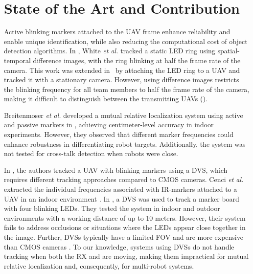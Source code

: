 \documentclass[lettersize,preprint]{elsarticle}
\begin{document}
\section{State of the Art and Contribution}\label{sec:sota}

Active blinking markers attached to the \gls{UAV} frame enhance reliability and enable unique identification, while also reducing the computational cost of object detection algorithms.
In \cite{whiteOpticalSpatialLocalization2019}, White \emph{et al.} tracked a static \gls{LED} ring using spatial-temporal difference images, with the ring blinking at half the frame rate of the camera. 
This work was extended in~\cite{whiteRobustOpticalSpatial2019} by attaching the \gls{LED} ring to a \gls{UAV} and tracked it with a stationary camera.
However, using difference images restricts the blinking frequency for all team members to half the frame rate of the camera, making it difficult to distinguish between the transmitting \glspl{UAV} ().

Breitenmoser \emph{et al.} developed a mutual relative localization system using active and passive markers in \cite{breitenmoserMonocularVisionbasedSystem2011}, achieving centimeter-level accuracy in indoor experiments. 
However, they observed that different marker frequencies could enhance robustness in differentiating robot targets. 
Additionally, the system was not tested for cross-talk detection when robots were close.

In \cite{stuckeyOpticalSpatialLocalization2021, stuckeySpatialLocalizationAttitude2022,censiLowlatencyLocalizationActive2013,ebmerRealtime6DoFPose2024}, the authors tracked a \gls{UAV} with blinking markers using a \gls{DVS}, which requires different tracking approaches compared to \gls{CMOS} cameras.
Cenci \emph{et al.} extracted the individual frequencies associated with \gls{IR}-markers attached to a \gls{UAV} in an indoor environment \cite{censiLowlatencyLocalizationActive2013}.
In \cite{ebmerRealtime6DoFPose2024}, a \gls{DVS} was used to track a marker board with four blinking \glspl{LED}. 
They tested the system in indoor and outdoor environments with a working distance of up to 10 meters.
However, their system fails to address occlusions or situations where the \glspl{LED} appear close together in the image. Further, \glspl{DVS} typically have a limited \gls{FOV} and are more expensive than \gls{CMOS} cameras \cite{walterFastMutualRelative2018a}. 
To our knowledge, systems using \glspl{DVS} do not handle tracking when both the \gls{RX} and  are moving, making them impractical for mutual relative localization and, consequently, for multi-robot systems.
\end{document}
